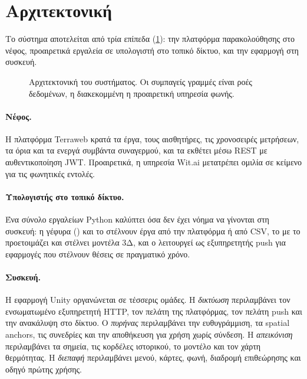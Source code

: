 \section{Αρχιτεκτονική}
\label{sec:architecture}

Το σύστημα αποτελείται από τρία επίπεδα (\cref{fig:architecture}): την πλατφόρμα παρακολούθησης στο νέφος, προαιρετικά εργαλεία σε υπολογιστή στο τοπικό δίκτυο, και την εφαρμογή στη συσκευή.

\begin{figure}[htbp]
  \centering
  \resizebox{\textwidth}{!}{}
  \caption{Αρχιτεκτονική του συστήματος. Οι συμπαγείς γραμμές είναι ροές δεδομένων, η διακεκομμένη η προαιρετική υπηρεσία φωνής.}
  \label{fig:architecture}
\end{figure}

\paragraph{Νέφος.} Η πλατφόρμα Terraweb κρατά τα έργα, τους αισθητήρες, τις χρονοσειρές μετρήσεων, τα όρια και τα ενεργά συμβάντα συναγερμού, και τα εκθέτει μέσω REST με αυθεντικοποίηση JWT. Προαιρετικά, η υπηρεσία Wit.ai μετατρέπει ομιλία σε κείμενο για τις φωνητικές εντολές.

\paragraph{Υπολογιστής στο τοπικό δίκτυο.} Ένα σύνολο εργαλείων Python καλύπτει όσα δεν έχει νόημα να γίνονται στη συσκευή: η γέφυρα () και το  στέλνουν έργα από την πλατφόρμα ή από CSV, το  με το  προετοιμάζει και στέλνει μοντέλα 3Δ, και ο  λειτουργεί ως εξυπηρετητής push για εφαρμογές που στέλνουν θέσεις σε πραγματικό χρόνο.

\paragraph{Συσκευή.} Η εφαρμογή Unity οργανώνεται σε τέσσερις ομάδες. Η \emph{δικτύωση} περιλαμβάνει τον ενσωματωμένο εξυπηρετητή HTTP, τον πελάτη της πλατφόρμας, τον πελάτη push και την ανακάλυψη στο δίκτυο. Ο \emph{πυρήνας} περιλαμβάνει την ευθυγράμμιση, τα spatial anchors, τις συνεδρίες και την αποθήκευση για χρήση χωρίς σύνδεση. Η \emph{απεικόνιση} περιλαμβάνει τα σημεία, τις κορδέλες ιστορικού, το μοντέλο και τον χάρτη θερμότητας. Η \emph{διεπαφή} περιλαμβάνει μενού, κάρτες, φωνή, διαδρομή επιθεώρησης και οδηγό πρώτης χρήσης.

